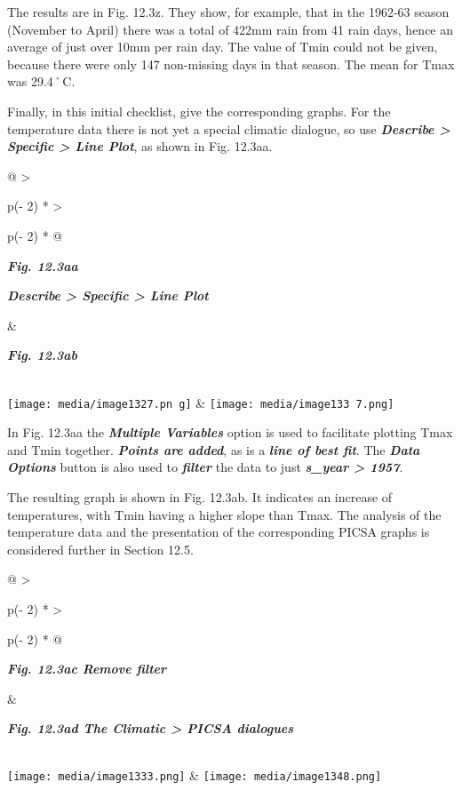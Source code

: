\documentclass[
  letterpaper,
  DIV=11,
  numbers=noendperiod]{scrreprt}
\begin{document}
The results are in Fig. 12.3z. They show, for example, that in the
1962-63 season (November to April) there was a total of 422mm rain from
41 rain days, hence an average of just over 10mm per rain day. The value
of Tmin could not be given, because there were only 147 non-missing days
in that season. The mean for Tmax was 29.4˚C.

Finally, in this initial checklist, give the corresponding graphs. For
the temperature data there is not yet a special climatic dialogue, so
use \textbf{\emph{Describe \textgreater{} Specific \textgreater{} Line
Plot}}, as shown in Fig. 12.3aa.

\begin{longtable}[]{@{}
  >{\raggedright\arraybackslash}p{(\columnwidth - 2\tabcolsep) * }
  >{\raggedright\arraybackslash}p{(\columnwidth - 2\tabcolsep) * }@{}}
\toprule\noalign{}
\begin{minipage}[b]{\linewidth}\raggedright
\textbf{\emph{Fig. 12.3aa}}

\textbf{\emph{Describe \textgreater{} Specific \textgreater{} Line
Plot}}
\end{minipage} & \begin{minipage}[b]{\linewidth}\raggedright
\textbf{\emph{Fig. 12.3ab}}
\end{minipage} \\
\midrule\noalign{}
\endhead
\bottomrule\noalign{}
\endlastfoot
\texttt{[image: media/image1327.pn g]}
&
\texttt{[image: media/image133 7.png]} \\
\end{longtable}

In Fig. 12.3aa the \textbf{\emph{Multiple Variables}} option is used to
facilitate plotting Tmax and Tmin together. \textbf{\emph{Points are
added}}, as is a \textbf{\emph{line of best fit}}. The
\textbf{\emph{Data Options}} button is also used to
\textbf{\emph{filter}} the data to just \textbf{\emph{s\_year
\textgreater{} 1957}}.

The resulting graph is shown in Fig. 12.3ab. It indicates an increase of
temperatures, with Tmin having a higher slope than Tmax. The analysis of
the temperature data and the presentation of the corresponding PICSA
graphs is considered further in Section 12.5.

\begin{longtable}[]{@{}
  >{\raggedright\arraybackslash}p{(\columnwidth - 2\tabcolsep) * }
  >{\raggedright\arraybackslash}p{(\columnwidth - 2\tabcolsep) * }@{}}
\toprule\noalign{}
\begin{minipage}[b]{\linewidth}\raggedright
\textbf{\emph{Fig. 12.3ac Remove filter}}
\end{minipage} & \begin{minipage}[b]{\linewidth}\raggedright
\textbf{\emph{Fig. 12.3ad The Climatic \textgreater{} PICSA dialogues}}
\end{minipage} \\
\midrule\noalign{}
\endhead
\bottomrule\noalign{}
\endlastfoot
\texttt{[image: media/image1333.png]}
&
\texttt{[image: media/image1348.png]} \\
\end{longtable}
\end{document}
